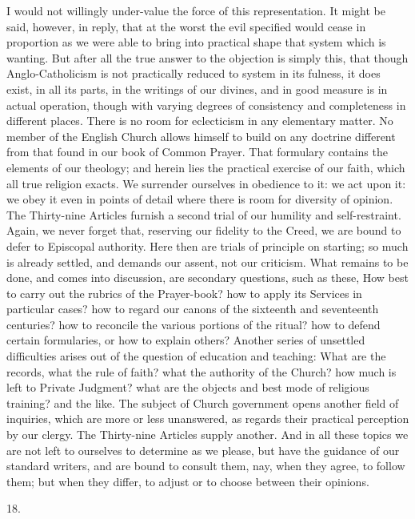 I would not willingly under-value the force of this representation.
It might be said, however, in reply, that at the worst the evil
specified would cease in proportion as we were able to bring into
practical shape that system which is wanting. But after all the true
answer to the objection is simply this, that though Anglo-Catholicism
is not practically reduced to system in its fulness, it does
exist, in all its parts, in the writings of our divines, and in good
measure is in actual operation, though with varying degrees of
consistency and completeness in different places. There is no room for
eclecticism in any elementary matter. No member of the English Church
allows himself to build on any doctrine different from that found in
our book of Common Prayer. That formulary contains the elements of our
theology; and herein lies the practical exercise of our faith, which
all true religion exacts. We surrender ourselves in obedience to it:
we act upon it: we obey it even in points of detail where there is
room for diversity of opinion. The Thirty-nine Articles furnish a
second trial of our humility and self-restraint. Again, we never
forget that, reserving our fidelity to the Creed, we are bound to
defer to Episcopal authority. Here then are trials of principle on
starting; so much is already settled, and demands our assent, not our
criticism. What remains to be done, and comes into discussion, are
secondary questions, such as these, How best to carry out the rubrics
of the Prayer-book? how to apply its Services in particular cases? how
to regard our canons of the sixteenth and seventeenth centuries? how
to reconcile the various portions of the ritual? how to defend certain
formularies, or how to explain others? Another series of unsettled
difficulties arises out of the question of education and teaching:
What are the records, what the rule of faith? what the authority of
the Church? how much is left to Private Judgment? what are the objects
and best mode of religious training? and the like. The subject of
Church government opens another field of inquiries, which are more or
less unanswered, as regards their practical perception by our clergy.
The Thirty-nine Articles supply another. And in all these topics we
are not left to ourselves to determine as we please, but have the
guidance of our standard writers, and are bound to consult them,
nay, when they agree, to follow them; but when they differ, to adjust
or to choose between their opinions.

18.

